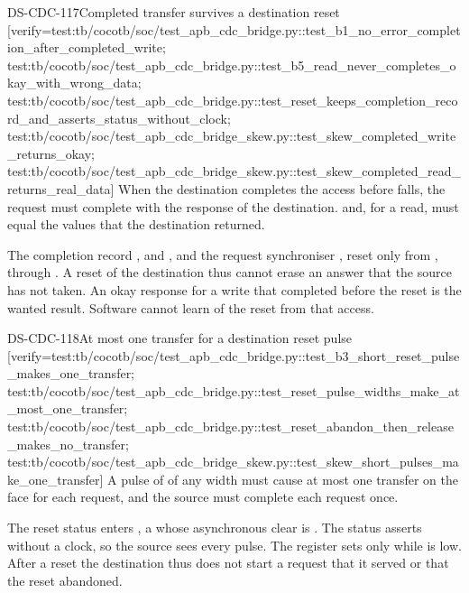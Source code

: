 \begin{requirement}{DS-CDC-117}{Completed transfer survives a destination reset}
[verify={test:tb/cocotb/soc/test_apb_cdc_bridge.py::test_b1_no_error_completion_after_completed_write; test:tb/cocotb/soc/test_apb_cdc_bridge.py::test_b5_read_never_completes_okay_with_wrong_data; test:tb/cocotb/soc/test_apb_cdc_bridge.py::test_reset_keeps_completion_record_and_asserts_status_without_clock; test:tb/cocotb/soc/test_apb_cdc_bridge_skew.py::test_skew_completed_write_returns_okay; test:tb/cocotb/soc/test_apb_cdc_bridge_skew.py::test_skew_completed_read_returns_real_data}]
When the destination completes the access before  falls, the request must complete with the response of the destination.  and, for a read,  must equal the values that the destination returned.
\end{requirement}
\begin{rationale}
The completion record ,  and , and the request synchroniser , reset only from , through . A reset of the destination thus cannot erase an answer that the source has not taken. An okay response for a write that completed before the reset is the wanted result. Software cannot learn of the reset from that access.
\end{rationale}

\begin{requirement}{DS-CDC-118}{At most one transfer for a destination reset pulse}
[verify={test:tb/cocotb/soc/test_apb_cdc_bridge.py::test_b3_short_reset_pulse_makes_one_transfer; test:tb/cocotb/soc/test_apb_cdc_bridge.py::test_reset_pulse_widths_make_at_most_one_transfer; test:tb/cocotb/soc/test_apb_cdc_bridge.py::test_reset_abandon_then_release_makes_no_transfer; test:tb/cocotb/soc/test_apb_cdc_bridge_skew.py::test_skew_short_pulses_make_one_transfer}]
A pulse of  of any width must cause at most one transfer on the  face for each request, and the source must complete each request once.
\end{requirement}
\begin{rationale}
The reset status enters , a  whose asynchronous clear is . The status asserts without a clock, so the source sees every pulse. The register  sets only while  is low. After a reset the destination thus does not start a request that it served or that the reset abandoned.
\end{rationale}

